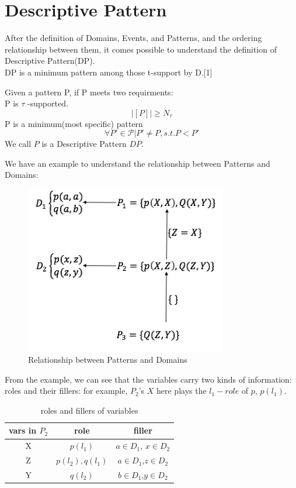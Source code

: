 \section{Descriptive Pattern}
After the definition of Domains, Events, and Patterns, and the ordering relationship between them, it comes possible to understand the definition of Descriptive Pattern(DP).\\
DP is a minimum pattern among those t-support by D.[1]
\begin{definition}
Given a pattern P, if P meets two requirments:\\
P is $\tau$ -supported. 
\begin{displaymath}
|[P]|\geq N_\tau
\end{displaymath}
P is a minimum(most specific) pattern
\begin{displaymath}
\forall P' \in \mathcal{P}|P' \ne P, s.t.P < P'
\end{displaymath}
We call $P$ is a Descriptive Pattern $DP$.
\end{definition}
We have an example to understand the relationship between Patterns and Domains:
\begin{figure}[!h]
\centering
\includegraphics[width=250pt]{./pictures/0303.png}
\caption{Relationship between Patterns and Domains }
\end{figure}
\newpage
From the example, we can see that the variables carry two kinds of information: roles and their fillers:
for example, $P_2$'s $X$ here plays the $l_1 -role$ of $p$, $p(l_1)$.
\begin{table}[!h]
\centering
\begin{tabular}{ccc}
\hline
vars in $P_2$ & role & filler\\
\hline
X & $p(l_1)$ & $a \in D_1$, $x \in D_2$\\
Z & $p(l_2),q(l_1)$ & $a \in D_1$,$z \in D_2$\\
Y & $q(l_2)$ & $b \in D_1$,$y \in D_2$\\
\hline
\end{tabular}
\caption{roles and fillers of variables}
\end{table}
